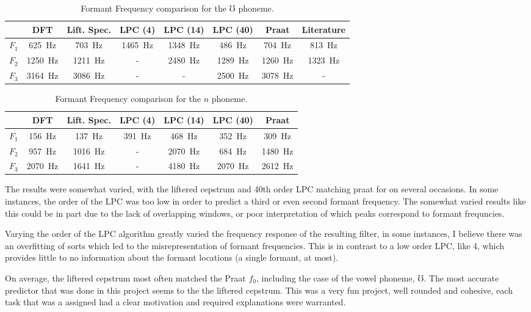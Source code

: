 \documentclass[letterpaper]{article}
\begin{document}
\begin{table}[h]
    \centering
    \begin{tabular}{c||c|c|c|c|c||c||c}
          & DFT & Lift. Spec. & LPC (4) & LPC (14) & LPC (40) & Praat & Literature\footnotemark \\
    \hline
    \hline
    $F_1$ & 625~Hz  &    703~Hz    & 1465~Hz  &  1348~Hz  &  486~Hz  & 704~Hz & 813~Hz\\
    $F_2$ & 1250~Hz &    1211~Hz   &   -   &  2480~Hz  & 1289~Hz  & 1260~Hz & 1323~Hz\\
    $F_3$ & 3164~Hz &    3086~Hz   &  -    &    -  & 2500~Hz  & 3078~Hz & -\\
    \end{tabular}
    \caption{Formant Frequency comparison for the $\mho$ phoneme.}
    \label{tab:uFormant}
\end{table}


\begin{table}[h]
    \centering
    \begin{tabular}{c||c|c|c|c|c||c}
          & DFT & Lift. Spec. & LPC (4) & LPC (14) & LPC (40) & Praat \\   
    \hline
    \hline
    $F_1$ & 156~Hz &  137~Hz      &  391~Hz   &   468~Hz  &  352~Hz  &  309~Hz  \\
    $F_2$ & 957~Hz &   1016~Hz    &  -     &   2070~Hz  & 684~Hz    & 1480~Hz    \\
    $F_3$ & 2070~Hz &  1641~Hz    &  -     &   4180~Hz    & 2070~Hz   &   2612~Hz \\
    \end{tabular}
    \caption{Formant Frequency comparison for the $n$ phoneme.}
    \label{tab:nFormant}
\end{table}


The results were somewhat varied, with the liftered cepstrum and 40th order LPC matching praat for on several occasions. In some instances, the order of the LPC was too low in order to predict a third or even second formant frequency. The somewhat varied results like this could be in part due to the lack of overlapping windows, or poor interpretation of which peaks correspond to formant frequncies. 

Varying the order of the LPC algorithm greatly varied the frequency response of the resulting filter, in some instances, I believe there was an overfitting of sorts which led to the misrepresentation of formant frequencies. This is in contrast to a low order LPC, like 4, which provides little to no information about the formant locations (a single formant, at most).

On average, the liftered cepstrum most often matched the Praat $f_0$, including the case of the vowel phoneme, $\mho$. The most accurate predictor that was done in this project seems to the the liftered cepstrum.  This was a very fun project, well rounded and cohesive, each task that was a assigned had a clear motivation and required explanations were warranted.





\end{document}
